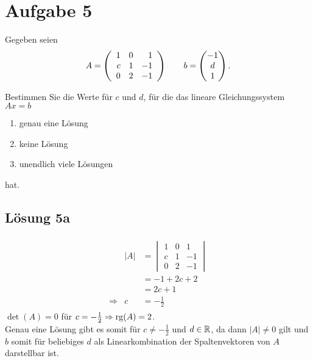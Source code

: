 \documentclass[main.tex]{subfiles}
\begin{document}
\section{Aufgabe 5}
Gegeben seien
$$
    A = \eqmatrix{rrr}{
        1 & 0 & 1 \\
        c & 1 & -1 \\
        0 & 2 & -1}
    \qquad
    b = \vektor{-1 \\ d \\ 1}.
$$

Bestimmen Sie die Werte für $c$ und $d$, für die das lineare Gleichungssystem $Ax=b$
\begin{enumerate}
    \item genau eine Lösung
    \item keine Lösung
    \item unendlich viele Lösungen
\end{enumerate}
hat.

\subsection{Lösung 5a}
\begin{align*}
		\begin{array}{rrl}
			& |A| & = \begin{vmatrix}
				1 & 0 & 1\\
				c & 1 & -1\\
				0 & 2 & -1
			\end{vmatrix}\\[7mm]
			& & = -1+2c+2\\
			& & = 2c+1\\
			\Rightarrow & c & = -\frac{1}{2}
		\end{array}
	\end{align*}
	$\det(A)=0$ für $c=-\frac{1}{2}\Rightarrow \operatorname{rg}(A)=2$.\vspace{5mm}\\
	 Genau eine Lösung gibt es somit für $c\neq -\frac{1}{2}$ und $d \in \mathbb{R}$, da dann $|A| \neq 0$ gilt und $b$ somit für beliebiges $d$ als Linearkombination der Spaltenvektoren von $A$ darstellbar ist.
\end{document}
